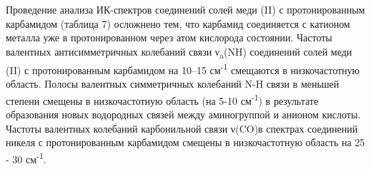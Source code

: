 \begin{multicols}{2}
Проведение анализа ИК-спектров соединений солей меди (II) с
протонированным карбамидом (таблица 7) осложнено тем, что карбамид
соединяется с катионом металла уже в протонированном через атом
кислорода состоянии. Частоты валентных антисимметричных колебаний связи
ν\textsubscript{a}(NH) соединений солей меди (II) с протонированным
карбамидом на 10--15 см\textsuperscript{-1} смещаются в низкочастотную
область. Полосы валентных симметричных колебаний N-H связи в меньшей
степени смещены в низкочастотную область (на 5-10
см\textsuperscript{-1}) в результате образования новых водородных связей
между аминогруппой и анионом кислоты. Частоты валентных колебаний
карбонильной связи ν(CO)в спектрах соединений никеля с протонированным
карбамидом смещены в низкочастотную область на 25 - 30
см\textsuperscript{-1}.
\end{multicols}

\begin{table}[H]
\caption*{Таблица 7 - Значения характеристических частот(см\textsuperscript{-1}) в ИК спектрах поглощения соединений протонированного карбамида с солями меди (II)}
\centering
{}
\end{table}


